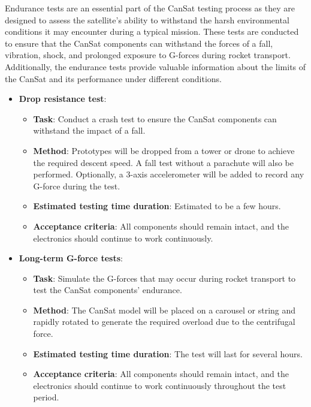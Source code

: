 \documentclass[11pt]{article}
\begin{document}
Endurance tests are an essential part of the CanSat testing process as they are designed to assess the satellite's ability to withstand the harsh environmental conditions it may encounter during a typical mission. These tests are conducted to ensure that the CanSat components can withstand the forces of a fall, vibration, shock, and prolonged exposure to G-forces during rocket transport. Additionally, the endurance tests provide valuable information about the limits of the CanSat and its performance under different conditions. 

\begin{itemize}[labelwidth=0cm, leftmargin=0cm, itemindent=0.7cm, noitemsep, topsep=0pt, label={}]
\item \textbf{Drop resistance test}:
\begin{itemize}[labelwidth=2cm, leftmargin=1.9cm, label=, noitemsep, topsep=2pt]
\item[\faTasks] \textbf{Task}: Conduct a crash test to ensure the CanSat components can withstand the impact of a fall.
\item[\faFlask] \textbf{Method}: Prototypes will be dropped from a tower or drone to achieve the required descent speed. A fall test without a parachute will also be performed. Optionally, a 3-axis accelerometer will be added to record any G-force during the test.
\item[{\faHourglass[3]}] \textbf{Estimated testing time duration}: Estimated to be a few hours.
\item[{\faCheckSquare}] \textbf{Acceptance criteria}: All components should remain intact, and the electronics should continue to work continuously.
\end{itemize}
\item \textbf{Long-term G-force tests}:
\begin{itemize}[labelwidth=2cm, leftmargin=1.9cm, label=, noitemsep, topsep=2pt]
\item[\faTasks] \textbf{Task}: Simulate the G-forces that may occur during rocket transport to test the CanSat components' endurance.
\item[\faFlask] \textbf{Method}: The CanSat model will be placed on a carousel or string and rapidly rotated to generate the required overload due to the centrifugal force.
\item[{\faHourglass[3]}] \textbf{Estimated testing time duration}: The test will last for several hours.
\item[{\faCheckSquare}] \textbf{Acceptance criteria}: All components should remain intact, and the electronics should continue to work continuously throughout the test period.
\end{itemize}
\end{itemize}
\end{document}
